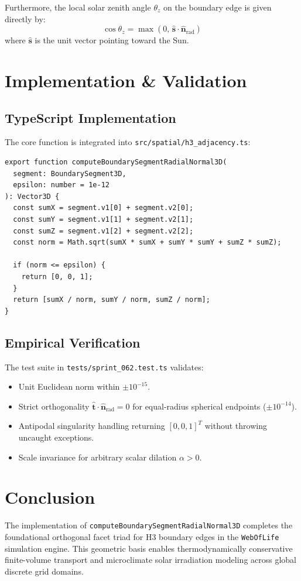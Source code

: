 \documentclass[10pt,journal,compsoc]{IEEEtran}
\begin{document}
Furthermore, the local solar zenith angle $\theta_z$ on the boundary edge is given directly by:
\begin{equation}
\cos \theta_z = \max(0, \, \hat{\mathbf{s}} \cdot \hat{\mathbf{n}}_{\text{rad}})
\end{equation}
where $\hat{\mathbf{s}}$ is the unit vector pointing toward the Sun.

\section{Implementation \& Validation}

\subsection{TypeScript Implementation}
The core function is integrated into \texttt{src/spatial/h3\_adjacency.ts}:
\begin{lstlisting}
export function computeBoundarySegmentRadialNormal3D(
  segment: BoundarySegment3D,
  epsilon: number = 1e-12
): Vector3D {
  const sumX = segment.v1[0] + segment.v2[0];
  const sumY = segment.v1[1] + segment.v2[1];
  const sumZ = segment.v1[2] + segment.v2[2];
  const norm = Math.sqrt(sumX * sumX + sumY * sumY + sumZ * sumZ);

  if (norm <= epsilon) {
    return [0, 0, 1];
  }
  return [sumX / norm, sumY / norm, sumZ / norm];
}
\end{lstlisting}

\subsection{Empirical Verification}
The test suite in \texttt{tests/sprint\_062.test.ts} validates:
\begin{itemize}
    \item Unit Euclidean norm within $\pm 10^{-15}$.
    \item Strict orthogonality $\hat{\mathbf{t}} \cdot \hat{\mathbf{n}}_{\text{rad}} = 0$ for equal-radius spherical endpoints ($\pm 10^{-14}$).
    \item Antipodal singularity handling returning $[0, 0, 1]^T$ without throwing uncaught exceptions.
    \item Scale invariance for arbitrary scalar dilation $\alpha > 0$.
\end{itemize}

\section{Conclusion}
The implementation of \texttt{computeBoundarySegmentRadialNormal3D} completes the foundational orthogonal facet triad for H3 boundary edges in the \texttt{WebOfLife} simulation engine. This geometric basis enables thermodynamically conservative finite-volume transport and microclimate solar irradiation modeling across global discrete grid domains.
\end{document}

